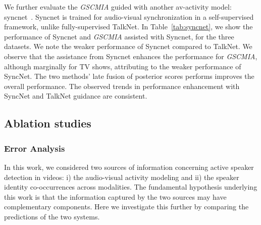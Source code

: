 We further evaluate the \emph{GSCMIA} guided with another av-activity model: syncnet~\cite{chung2016out}. Syncnet is trained for audio-visual synchronization in a self-supervised framework, unlike fully-supervised TalkNet. In Table~\ref{tab:syncnet}, we show the performance of Syncnet and \emph{GSCMIA} assisted with Syncnet, for the three datasets. We note the weaker performance of Syncnet compared to TalkNet. We observe that the assistance from Syncnet enhances the performance for \emph{GSCMIA}, although marginally for TV shows, attributing to the weaker performance of SyncNet. The two methods' late fusion of posterior scores performs improves the overall performance. The observed trends in performance enhancement with SyncNet and TalkNet guidance are consistent. 


\begin{table}[]
\centering
\caption{Performance of various strategies for ASD when guided with Syncnet~\cite{chung2016out}. The reporting metric is mean average precision (\%).}
\label{tab:syncnet}
\end{table}
\subsection{Ablation studies}
\subsubsection{Error Analysis}
In this work, we considered two sources of information concerning active speaker detection in videos: i) the audio-visual activity modeling and ii) the speaker identity co-occurrences across modalities. The fundamental hypothesis underlying this work is that the information captured by the two sources may have complementary components. Here we investigate this further by comparing the predictions of the two systems. 




